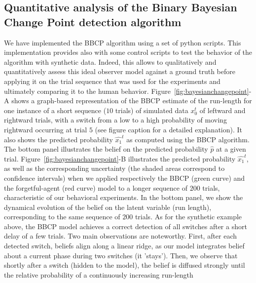 \documentclass[12pt,english]{article}%
\newcommand{\seeFig}[1]{Figure~\ref{fig:#1}}
\newcommand{\seeApp}[1]{Appendix~\ref{app:#1}}
\begin{document}
\subsection{Quantitative analysis of the Binary Bayesian Change Point detection algorithm}
We have implemented 
the BBCP algorithm%
using a set of python scripts.
This implementation provides also with some control scripts
to test the behavior of the algorithm with synthetic data.
Indeed, this allows to qualitatively and quantitatively assess
this ideal observer model against a ground truth before applying it
on the trial sequence that was used for the experiments and
ultimately comparing it to the human behavior. %
\seeFig{bayesianchangepoint}-A shows a graph-based representation of the BBCP estimate of the run-length for one instance of a short sequence ($10$ trials) of simulated data $x_0^t$
of leftward and rightward trials, with a switch from a low to a high probability
of moving rightward occurring at trial $5$ (see figure caption for a detailed explanation).
It also shows the predicted probability $\hat{x_1}^t$
as computed using the BBCP algorithm.
The bottom panel illustrates
the belief on the predicted probability $\hat{p}$ at a given trial.
\seeFig{bayesianchangepoint}-B illustrates the predicted probability $\hat{x_1}^t$, as well as the corresponding uncertainty (the shaded areas correspond to confidence intervals) when
we applied respectively the BBCP (green curve) and the forgetful-agent (red curve) model to
a longer sequence of $200$ trials,
characteristic of our behavioral experiments.
In the bottom panel,
we show the dynamical evolution of the belief on the latent variable (run length),
corresponding to the same sequence of $200$ trials.
As for the synthetic example above,
the BBCP model achieves a correct detection of all switches after a short delay of a few trials.
Two main observations are noteworthy. First, after each detected switch, beliefs align along a linear ridge,
as our model integrates belief about a current phase during two switches (it 'stays').
Then, we observe that shortly after a switch (hidden to the model),
the belief is diffused strongly until the relative probability of a continuously increasing run-length
\end{document}
